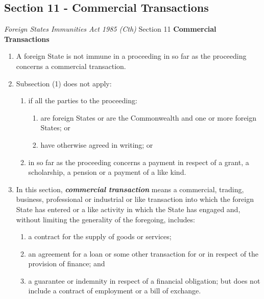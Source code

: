 \subsection{Section 11 - Commercial Transactions}
\begin{statutedetails}{\textit{Foreign States Immunities Act 1985 (Cth)} Section 11}
    \flushleft
    \textbf{Commercial Transactions}

    \begin{enumerate}[label=(\arabic*)]
        \item A foreign State is not immune in a proceeding in so far as the proceeding concerns a commercial transaction.
        \item Subsection (1) does not apply:
        \begin{enumerate}
            \item if all the parties to the proceeding:
            \begin{enumerate}[label=(\roman*)]
                \item are foreign States or are the Commonwealth and one or more foreign States; or
                \item have otherwise agreed in writing; or
            \end{enumerate}
            \item in so far as the proceeding concerns a payment in respect of a grant, a scholarship, a pension or a payment of a like kind.
        \end{enumerate}
        \item In this section, \textit{\textbf{commercial transaction}} means a commercial, trading, business, professional or industrial or like transaction into which the foreign State has entered or a like activity in which the State has engaged and, without limiting the generality of the foregoing, includes:
        \begin{enumerate}[label=(\alph*)]
            \item a contract for the supply of goods or services;
            \item an agreement for a loan or some other transaction for or in respect of the provision of finance; and
            \item a guarantee or indemnity in respect of a financial obligation; but does not include a contract of employment or a bill of exchange.
        \end{enumerate} 
    \end{enumerate}
\end{statutedetails}

